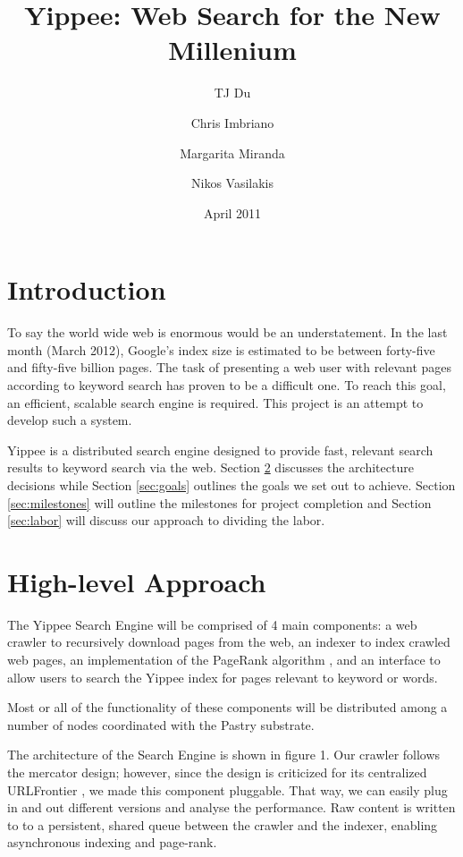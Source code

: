 \documentclass[11pt, letterpaper, oneside, twocolumn]{article}
\begin{document}
\title{Yippee: Web Search for the New Millenium}
\author{	TJ Du
	\and Chris Imbriano
	\and Margarita Miranda
	\and Nikos Vasilakis}
\date{April 2011}

\maketitle

\section{ Introduction }

To say the world wide web is enormous would be an understatement.  In the last month (March 2012),  Google's index size is estimated to be between forty-five and fifty-five billion pages.\cite{websize} The task of presenting a web user with relevant pages according to keyword search has proven to be a difficult one.\cite{google} To reach this goal, an efficient, scalable search engine is required.  This project is an attempt to develop such a system.

Yippee is a distributed search engine designed to provide fast, relevant search results to keyword search via the web.  Section \ref{sec:approach} discusses the architecture decisions while Section \ref{sec:goals}  outlines the goals we set out to achieve.  Section \ref{sec:milestones} will outline the milestones for project completion and Section \ref{sec:labor} will discuss our approach to dividing the labor.


\section{ High-level Approach }
\label{sec:approach}

The Yippee Search Engine will be comprised of 4 main components: a web crawler to recursively download pages from the web, an indexer to index crawled web pages, an implementation of the PageRank algorithm \cite{pagerank}, and an interface to allow users to search the Yippee index for pages relevant to keyword or words.

Most or all of the functionality of these components will be distributed among a number of nodes coordinated with the Pastry substrate. 

The architecture of the Search Engine  is shown in figure 1. Our crawler
follows the mercator design\cite{mercator}; however, since the design is
criticized for its centralized URLFrontier \cite{ubi,para}, we made this
component pluggable. That  way, we can easily plug in  and out different
versions and  analyse the performance.  Raw content  is written to  to a
persistent, shared queue  between the crawler and  the indexer, enabling
asynchronous indexing and page-rank.
\end{document}
